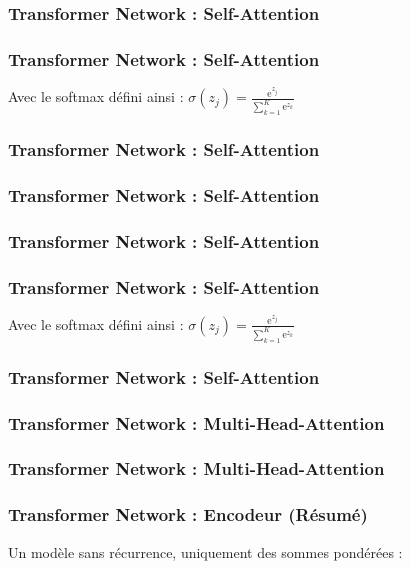 \begin{frame}
  \frametitle{Transformer Network : Self-Attention}
\end{frame}

\begin{frame}
  \frametitle{Transformer Network : Self-Attention}
  Avec le softmax défini ainsi : $\sigma(z_j)=\frac {\mathrm{e}^{z_j}}{\sum _{k=1}^{K}\mathrm{e}^{z_{k}}}$
\end{frame}

\begin{frame}
  \frametitle{Transformer Network : Self-Attention}
\end{frame}

\begin{frame}
  \frametitle{Transformer Network : Self-Attention}
\end{frame}

\begin{frame}
  \frametitle{Transformer Network : Self-Attention}
\end{frame}

\begin{frame}
  \frametitle{Transformer Network : Self-Attention}
  Avec le softmax défini ainsi : $\sigma(z_j)=\frac {\mathrm{e}^{z_j}}{\sum _{k=1}^{K}\mathrm{e}^{z_{k}}}$
\end{frame}

\begin{frame}
  \frametitle{Transformer Network : Self-Attention}
\end{frame}


\begin{frame}
  \frametitle{Transformer Network : Multi-Head-Attention}
\end{frame}

\begin{frame}
  \frametitle{Transformer Network : Multi-Head-Attention}
\end{frame}

\begin{frame}
  \frametitle{Transformer Network : Encodeur (Résumé)}
  Un modèle sans récurrence, uniquement des sommes pondérées : \\
\end{frame}

